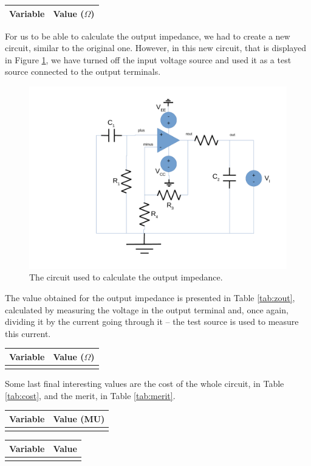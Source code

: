 \begin{center}
\begin{tabular}{|l|r|}
  \hline    
  {\bf Variable} & {\bf Value ($\Omega$)} \\ \hline
  
\end{tabular}
\end{center}

For us to be able to calculate the output impedance, we had to create a new circuit, similar to the original one. However, in this new circuit, that is displayed in Figure \ref{fig:circuit-out}, we have turned off the input voltage source and used it as a test source connected to the output terminals.

\begin{figure}[H] \centering
\includegraphics[width=0.7\linewidth]{circuit-out.pdf}
\caption{The circuit used to calculate the output impedance.}
\label{fig:circuit-out}
\end{figure}

The value obtained for the output impedance is presented in Table \ref{tab:zout}, calculated by measuring the voltage in the output terminal and, once again, dividing it by the current going through it -- the test source is used to measure this current.

\begin{center}
\begin{tabular}{|l|r|}
  \hline    
  {\bf Variable} & {\bf Value ($\Omega$)} \\ \hline
  
  \label{tab:zout}
\end{tabular}
\end{center}

Some last final interesting values are the cost of the whole circuit, in Table \ref{tab:cost}, and the merit, in Table \ref{tab:merit}.

\begin{center}
\begin{tabular}{|l|r|}
  \hline    
  {\bf Variable} & {\bf Value (MU)} \\ \hline
  
  \label{tab:cost}
\end{tabular}
\end{center}

\begin{center}
\begin{tabular}{|l|r|}
  \hline    
  {\bf Variable} & {\bf Value} \\ \hline
  
  \label{tab:merit}
\end{tabular}
\end{center}